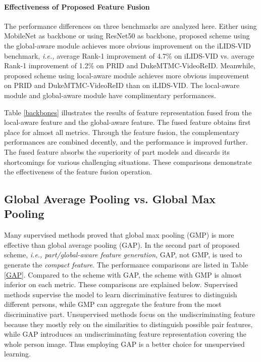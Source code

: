 \documentclass{cta-author}
\begin{document}
	\paragraph{Effectiveness of Proposed Feature Fusion}
	The performance differences on three benchmarks are analyzed here. Either using MobileNet as backbone or using ResNet50 as backbone, proposed scheme using the global-aware module achieves more obvious improvement on the iLIDS-VID benchmark, \textit{i.e.,} average Rank-1 improvement of 4.7\% on iLIDS-VID vs. average Rank-1 improvement of 1.2\% on PRID and DukeMTMC-VideoReID. Meanwhile, proposed scheme using local-aware module achieves more obvious improvement on PRID and DukeMTMC-VideoReID than on iLIDS-VID. The local-aware module and global-aware module have complimentary performances. 
	
	Table \ref{backbones} illustrates the results of feature representation fused from the local-aware feature and the global-aware feature. The fused feature obtains first place for almost all metrics. Through the feature fusion, the complementary performances are combined decently, and the performance is improved further. The fused feature absorbs the superiority of part models and discards its shortcomings for various challenging situations. These comparisons demonstrate the effectiveness of the feature fusion operation. 
	
	\subsection{Global Average Pooling vs. Global Max Pooling} \label{GAP vs. GMP}
	Many supervised methods \cite{RN318} \cite{RN394} \cite{RN314} proved that global max pooling (GMP) is more effective than global average pooling (GAP). In the second part of proposed scheme, \textit{i.e., part/global-aware feature generation}, GAP, not GMP, is used to generate the \textit{compact feature}. The performance comparisons are listed in Table \ref{GAP}. Compared to the scheme with GAP, the scheme with GMP is almost inferior on each metric. These comparisons are explained below. Supervised methods supervise the model to learn discriminative features to distinguish different persons, while GMP can aggregate the feature from the most discriminative part. Unsupervised methods focus on the undiscriminating feature because they mostly rely on the similarities to distinguish possible pair features, while GAP introduces an undiscriminating feature representation covering the whole person image. Thus employing GAP is a better choice for unsupervised learning.
	
\end{document}
